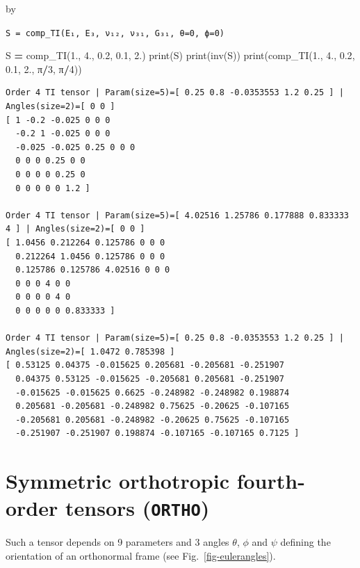 \documentclass[
  a4paper,
  numbers=noendperiod,
  DIV=12]{scrreprt}
\newenvironment{Shaded}{\begin{snugshade}}{\end{snugshade}}
\newcommand{\BuiltInTok}[1]{#1}
\newcommand{\DecValTok}[1]{\textcolor[rgb]{0.00,0.00,0.81}{#1}}
\newcommand{\FloatTok}[1]{\textcolor[rgb]{0.00,0.00,0.81}{#1}}
\newcommand{\NormalTok}[1]{#1}
\newcommand{\OperatorTok}[1]{\textcolor[rgb]{0.81,0.36,0.00}{\textbf{#1}}}
\begin{document}
by

\texttt{S\ =\ comp\_TI(E₁,\ E₃,\ ν₁₂,\ ν₃₁,\ G₃₁,\ θ=0,\ ϕ=0)}

\begin{Shaded}
\begin{Highlighting}[]
\NormalTok{S }\OperatorTok{=}\NormalTok{ comp\_TI(}\FloatTok{1.}\NormalTok{, }\FloatTok{4.}\NormalTok{, }\FloatTok{0.2}\NormalTok{, }\FloatTok{0.1}\NormalTok{, }\FloatTok{2.}\NormalTok{)}
\BuiltInTok{print}\NormalTok{(S)}
\BuiltInTok{print}\NormalTok{(inv(S))}
\BuiltInTok{print}\NormalTok{(comp\_TI(}\FloatTok{1.}\NormalTok{, }\FloatTok{4.}\NormalTok{, }\FloatTok{0.2}\NormalTok{, }\FloatTok{0.1}\NormalTok{, }\FloatTok{2.}\NormalTok{, π}\OperatorTok{/}\DecValTok{3}\NormalTok{, π}\OperatorTok{/}\DecValTok{4}\NormalTok{))}
\end{Highlighting}
\end{Shaded}

\begin{verbatim}
Order 4 TI tensor | Param(size=5)=[ 0.25 0.8 -0.0353553 1.2 0.25 ] | Angles(size=2)=[ 0 0 ]
[ 1 -0.2 -0.025 0 0 0 
  -0.2 1 -0.025 0 0 0 
  -0.025 -0.025 0.25 0 0 0 
  0 0 0 0.25 0 0 
  0 0 0 0 0.25 0 
  0 0 0 0 0 1.2 ]

Order 4 TI tensor | Param(size=5)=[ 4.02516 1.25786 0.177888 0.833333 4 ] | Angles(size=2)=[ 0 0 ]
[ 1.0456 0.212264 0.125786 0 0 0 
  0.212264 1.0456 0.125786 0 0 0 
  0.125786 0.125786 4.02516 0 0 0 
  0 0 0 4 0 0 
  0 0 0 0 4 0 
  0 0 0 0 0 0.833333 ]

Order 4 TI tensor | Param(size=5)=[ 0.25 0.8 -0.0353553 1.2 0.25 ] | Angles(size=2)=[ 1.0472 0.785398 ]
[ 0.53125 0.04375 -0.015625 0.205681 -0.205681 -0.251907 
  0.04375 0.53125 -0.015625 -0.205681 0.205681 -0.251907 
  -0.015625 -0.015625 0.6625 -0.248982 -0.248982 0.198874 
  0.205681 -0.205681 -0.248982 0.75625 -0.20625 -0.107165 
  -0.205681 0.205681 -0.248982 -0.20625 0.75625 -0.107165 
  -0.251907 -0.251907 0.198874 -0.107165 -0.107165 0.7125 ]
\end{verbatim}

\section{\texorpdfstring{Symmetric orthotropic fourth-order tensors
(\texttt{ORTHO})}{Symmetric orthotropic fourth-order tensors (ORTHO)}}\label{symmetric-orthotropic-fourth-order-tensors-ortho}

Such a tensor depends on 9 parameters and 3 angles \(\theta\), \(\phi\)
and \(\psi\) defining the orientation of an orthonormal frame (see
Fig.~\ref{fig-eulerangles}).
\end{document}
